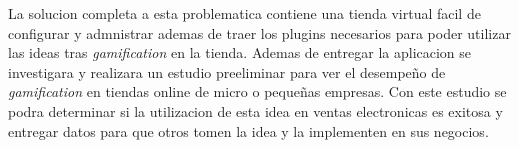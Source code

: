 La solucion completa a esta problematica contiene una tienda virtual facil de configurar y admnistrar ademas de traer 
los plugins necesarios para poder utilizar las ideas tras \emph{gamification} en la tienda. Ademas de entregar la 
aplicacion se investigara y realizara un estudio preeliminar para ver el desempeño de \emph{gamification} en tiendas
online de micro o pequeñas empresas. Con este estudio se podra determinar si la utilizacion de esta idea en ventas 
electronicas es exitosa y entregar datos para que otros tomen la idea y la implementen en sus negocios.


